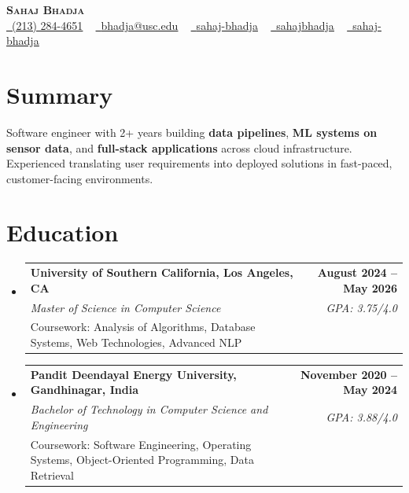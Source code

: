 \documentclass[letterpaper,10pt]{article}
\makeatletter
\newcommand{\resumeEduSubheading}[5]{\vspace{-1pt}\item\begin{tabular*}{1.0\textwidth}[t]{l@{\extracolsep{\fill}}r}\textbf{#1} & \textbf{\small #2} \\\textit{\small #3} & \textit{\small #4} \\\small #5 & \\\end{tabular*}\vspace{-4pt}}
\newcommand{\resumeSubHeadingListStart}{\begin{itemize}[leftmargin=0.0in, label={}]}
\newcommand{\resumeSubHeadingListEnd}{\end{itemize}}
\makeatother
\begin{document}
\begin{center}
{\Huge \scshape \textbf{Sahaj Bhadja}} \\ \vspace{1pt}
\small \href{tel:(213) 284-4651}{\faPhone\ \underline{(213) 284-4651}} ~ \href{mailto:bhadja@usc.edu}{\raisebox{-0.2\height}\faEnvelope\ \underline{bhadja@usc.edu}} ~
\href{https://www.linkedin.com/in/sahaj-bhadja/}{\raisebox{-0.2\height}\faLinkedin\ \underline{sahaj-bhadja}} ~ \href{https://github.com/SAHAJ-BHADJA}{\raisebox{-0.2\height}\faGithub\ \underline{sahajbhadja}} ~
\href{https://sahaj-bhadja.vercel.app/}{\raisebox{-0.2\height}\faGlobe\ \underline{sahaj-bhadja}}
\end{center}
\vspace{-18pt}
\section{Summary}
\begin{itemize}[leftmargin=0.15in, label={}]
\small{\item{Software engineer with 2+ years building \textbf{data pipelines}, \textbf{ML systems on sensor data}, and \textbf{full-stack applications} across cloud infrastructure. Experienced translating user requirements into deployed solutions in fast-paced, customer-facing environments.}}
\end{itemize}
\vspace{-16pt}
\section{Education}
\resumeSubHeadingListStart
\resumeEduSubheading{University of Southern California, Los Angeles, CA}{August 2024 -- May 2026}{Master of Science in Computer Science}{GPA: 3.75/4.0}{Coursework: Analysis of Algorithms, Database Systems, Web Technologies, Advanced NLP}
\vspace{-9pt}
\resumeEduSubheading{Pandit Deendayal Energy University, Gandhinagar, India}{November 2020 -- May 2024}{Bachelor of Technology in Computer Science and Engineering}{GPA: 3.88/4.0}{Coursework: Software Engineering, Operating Systems, Object-Oriented Programming, Data Retrieval}
\resumeSubHeadingListEnd
\vspace{-14pt}
\end{document}
